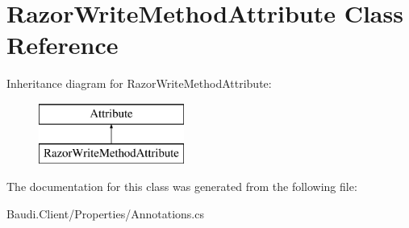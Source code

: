 \hypertarget{class_razor_write_method_attribute}{}\section{Razor\+Write\+Method\+Attribute Class Reference}
\label{class_razor_write_method_attribute}
Inheritance diagram for Razor\+Write\+Method\+Attribute\+:\begin{figure}[H]
\begin{center}
\leavevmode
\includegraphics[height=2.000000cm]{class_razor_write_method_attribute}
\end{center}
\end{figure}


The documentation for this class was generated from the following file\+:\begin{DoxyCompactItemize}
\item 
Baudi.\+Client/\+Properties/Annotations.\+cs\end{DoxyCompactItemize}
